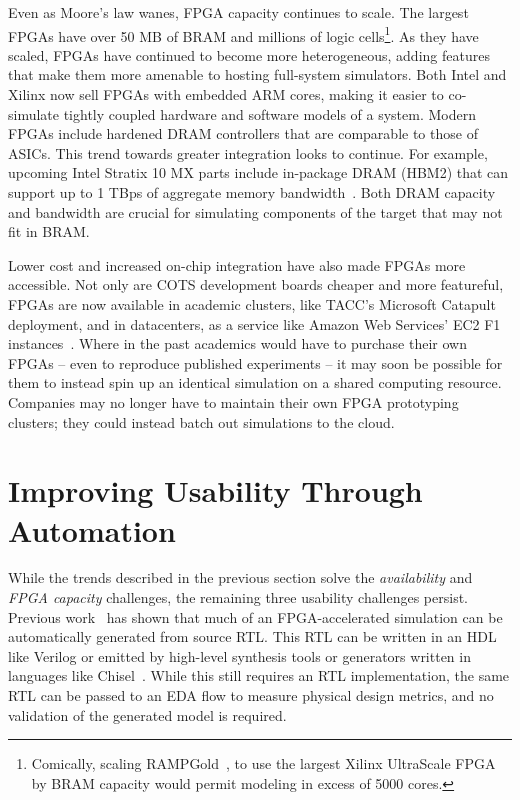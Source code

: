 Even as Moore's law wanes, FPGA capacity continues to scale. The largest FPGAs
have over 50 MB of BRAM and millions of logic cells\footnote{Comically, scaling
RAMPGold~\cite{rampgold}, to use the largest Xilinx UltraScale
FPGA~\cite{ultrascale} by BRAM capacity would permit modeling in excess of 5000
cores.}. As they have scaled, FPGAs have continued to become more
heterogeneous, adding features that make them more amenable to hosting
full-system simulators.  Both Intel and Xilinx now sell FPGAs with embedded ARM
cores, making it easier to co-simulate tightly coupled hardware and software
models of a system. Modern FPGAs include hardened DRAM controllers that are
comparable to those of ASICs. This trend towards greater integration looks to
continue. For example, upcoming Intel Stratix 10 MX parts include in-package DRAM (HBM2)
that can support up to 1 TBps of aggregate memory bandwidth~\cite{stratix10mx}.
Both DRAM capacity and bandwidth are crucial for simulating components
of the target that may not fit in BRAM.

Lower cost and increased on-chip integration have also made FPGAs more
accessible. Not only are COTS development boards cheaper and more featureful,
FPGAs are now available in academic clusters, like TACC's Microsoft
Catapult~\cite{catapultannounce} deployment, and in datacenters, as a service
like Amazon Web Services' EC2 F1 instances~\cite{amazonf1}. Where in the past
academics would have to purchase their own FPGAs -- even to reproduce published
experiments -- it may soon be possible for them to instead spin up an identical
simulation on a shared computing resource. Companies may no longer have to
maintain their own FPGA prototyping clusters; they could instead batch out
simulations to the cloud.

\section{Improving Usability Through Automation}

While the trends described in the previous section solve the
\emph{availability} and \emph{FPGA capacity} challenges, the remaining three
usability challenges persist. Previous work~\cite{fabscalarfpga, strober} has
shown that much of an FPGA-accelerated simulation can be automatically
generated from source RTL. This RTL can be written in an HDL like Verilog or
emitted by high-level synthesis tools or generators written in languages like
Chisel~\cite{chisel}. While this still requires an RTL implementation, the same
RTL can be passed to an EDA flow to measure physical design metrics, and no
validation of the generated model is required.

